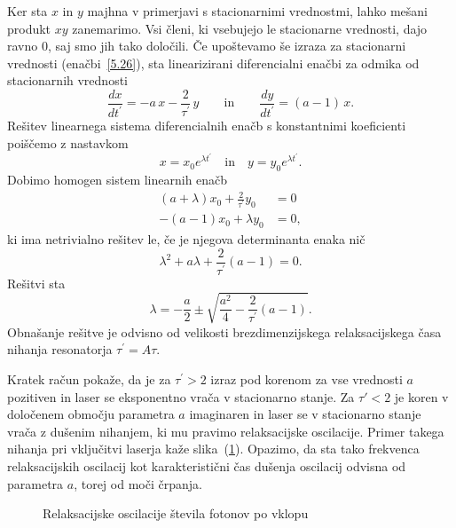 Ker sta $x$ in $y$ majhna v primerjavi s stacionarnimi vrednostmi, lahko
mešani produkt $xy$ zanemarimo. Vsi členi, ki vsebujejo le stacionarne vrednosti,
dajo ravno 0, saj smo jih tako določili. Če upoštevamo še izraza 
za stacionarni vrednosti (enačbi~\ref{5.26}), 
sta linearizirani diferencialni enačbi za odmika od stacionarnih vrednosti 
\begin{equation}
\frac{dx}{dt^{\prime }} =-a\,x-\frac{2}{\tau ^{\prime }}\,y   \qquad \mathrm{in} \qquad
\frac{dy}{dt^{\prime }} =(a-1)\,x.
\label{5.28}
\end{equation}
Rešitev linearnega sistema diferencialnih enačb s konstantnimi
koeficienti poiščemo z nastavkom
\begin{equation}
x=x_{0}e^{\lambda t^{\prime }} \quad \mathrm{in} \quad 
y=y_{0}e^{\lambda t^{\prime }}.
\label{5.29}
\end{equation}
Dobimo homogen sistem linearnih enačb 
\begin{align}
(a+\lambda )x_{0}+\frac{2}{\tau ^{\prime }}y_{0} &=0  \label{5.30} \\
-(a-1)x_{0}+\lambda y_{0} &=0,
\end{align}
ki ima netrivialno rešitev le, če je njegova determinanta enaka nič
\begin{equation}
\lambda ^{2}+a\lambda +\frac{2}{\tau ^{\prime }}(a-1)=0.  
\label{5.301}
\end{equation}
Rešitvi sta 
\begin{equation}
\lambda =-\frac{a}{2}\pm \sqrt{\frac{a^{2}}{4}-\frac{2}{\tau ^{\prime }}(a-1)}.
\label{5.31}
\end{equation}
Obnašanje rešitve je odvisno od velikosti brezdimenzijskega relaksacijskega
časa nihanja resonatorja $\tau ^{\prime }=A\tau $. 

Kratek račun pokaže, da je 
za $\tau ^{\prime }>2$ izraz pod korenom za vse vrednosti $a$ pozitiven in laser 
se eksponentno vrača v stacionarno stanje. Za $\tau' <2$ je koren v določenem območju
parametra $a$ imaginaren in laser se v stacionarno stanje vrača z
dušenim nihanjem, ki mu pravimo relaksacijske oscilacije. 
Primer takega nihanja 
pri vključitvi laserja kaže slika~(\ref{fig:relax}). Opazimo, da sta tako 
frekvenca relaksacijskih oscilacij kot karakteristični čas dušenja oscilacij
odvisna od parametra $a$, torej od moči črpanja.
\begin{figure}[h]
\centering
\def\svgwidth{80truemm} 

\caption{Relaksacijske oscilacije števila fotonov po vklopu}
\label{fig:relax}
\end{figure}

